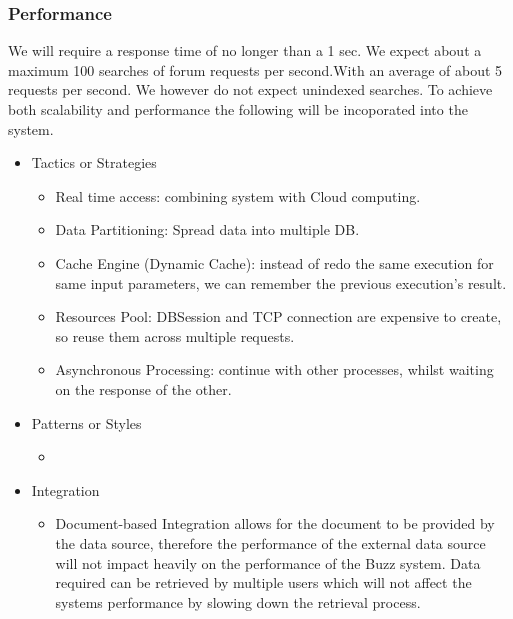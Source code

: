 \subsubsection{Performance}
		We will require a response time of no longer than a 1 sec. We expect about a maximum 100 searches of forum requests per second.With an average of about 5 requests per second. We however do not expect unindexed searches. To achieve both scalability and performance the following will be incoporated into the system.
		\begin{itemize}
	\item{Tactics or Strategies}
		\begin{itemize}
			\item Real time access: combining system with Cloud computing.
			\item Data Partitioning: Spread data into multiple DB.
			\item Cache Engine (Dynamic Cache): instead of redo the same execution for same input parameters, we can remember the previous execution's result.
			\item Resources Pool: DBSession and TCP connection are expensive to create, so reuse them across multiple requests.
			\item Asynchronous Processing: continue with other processes, whilst waiting on the response of the other.
		\end{itemize}
	\item{Patterns or Styles}
		\begin{itemize}
			\item
		\end{itemize}
	\item{Integration}
		\begin{itemize}
			\item Document-based Integration allows for the document to be provided by the data source, therefore the performance of the external data source will not impact heavily on the performance of the Buzz system. Data required can be retrieved by multiple users which will not affect the systems performance by slowing down the retrieval process. 
		\end{itemize}
\end{itemize}
